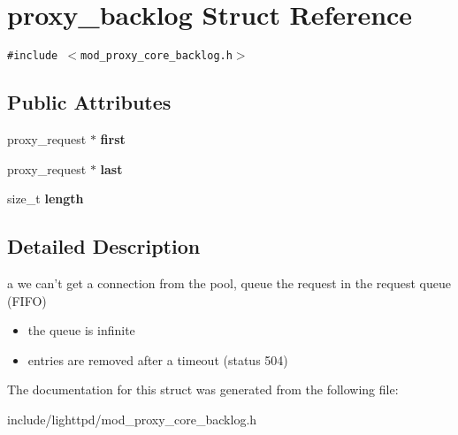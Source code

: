 \hypertarget{structproxy__backlog}{
\section{proxy\_\-backlog Struct Reference}
\label{structproxy__backlog}
}
{\tt \#include $<$mod\_\-proxy\_\-core\_\-backlog.h$>$}

\subsection*{Public Attributes}
\begin{CompactItemize}
\item 
\hypertarget{structproxy__backlog_f8dbd3217ff0b87c91f37cfc54f51f6e}{
proxy\_\-request $\ast$ \textbf{first}}
\label{structproxy__backlog_f8dbd3217ff0b87c91f37cfc54f51f6e}

\item 
\hypertarget{structproxy__backlog_c93bf722fd1a6fbf07b082d139eb5a1d}{
proxy\_\-request $\ast$ \textbf{last}}
\label{structproxy__backlog_c93bf722fd1a6fbf07b082d139eb5a1d}

\item 
\hypertarget{structproxy__backlog_145ac78a0adca3e5a5e58b68af8d1ee1}{
size\_\-t \textbf{length}}
\label{structproxy__backlog_145ac78a0adca3e5a5e58b68af8d1ee1}

\end{CompactItemize}


\subsection{Detailed Description}
a we can't get a connection from the pool, queue the request in the request queue (FIFO)

\begin{itemize}
\item the queue is infinite\item entries are removed after a timeout (status 504) \end{itemize}


The documentation for this struct was generated from the following file:\begin{CompactItemize}
\item 
include/lighttpd/mod\_\-proxy\_\-core\_\-backlog.h\end{CompactItemize}
